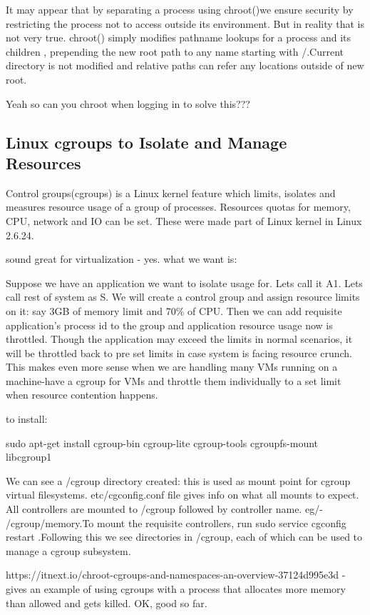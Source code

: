 It may appear that by separating a process using chroot()we ensure security by restricting the process not to access outside its environment. But in reality that is not very true. chroot() simply modifies pathname lookups for a process and its children , prepending the new root path to any name starting with /.Current directory is not modified and relative paths can refer any locations outside of new root.

Yeah so can you chroot when logging in to solve this???

\subsection{Linux cgroups to Isolate and Manage Resources}

Control groups(cgroups) is a Linux kernel feature which limits, isolates and measures resource usage of a group of processes. Resources quotas for memory, CPU, network and IO can be set. These were made part of Linux kernel in Linux 2.6.24.

sound great for virtualization - yes. what we want is:

Suppose we have an application we want to isolate usage for. Lets call it A1. Lets call rest of system as S. We will create a control group and assign resource limits on it: say 3GB of memory limit and 70\% of CPU. Then we can add requisite application’s process id to the group and application resource usage now is throttled. Though the application may exceed the limits in normal scenarios, it will be throttled back to pre set limits in case system is facing resource crunch. This makes even more sense when we are handling many VMs running on a machine-have a cgroup for VMs and throttle them individually to a set limit when resource contention happens.

to install:

sudo apt-get install cgroup-bin cgroup-lite cgroup-tools cgroupfs-mount libcgroup1

We can see a /cgroup directory created: this is used as mount point for cgroup virtual filesystems. etc/cgconfig.conf file gives info on what all mounts to expect. All controllers are mounted to /cgroup followed by controller name. eg/- /cgroup/memory.To mount the requisite controllers, run sudo service cgconfig restart .Following this we see directories in /cgroup, each of which can be used to manage a cgroup subsystem.

https://itnext.io/chroot-cgroups-and-namespaces-an-overview-37124d995e3d - gives an example of using cgroups with a process that allocates more memory than allowed and gets killed. OK, good so far.

